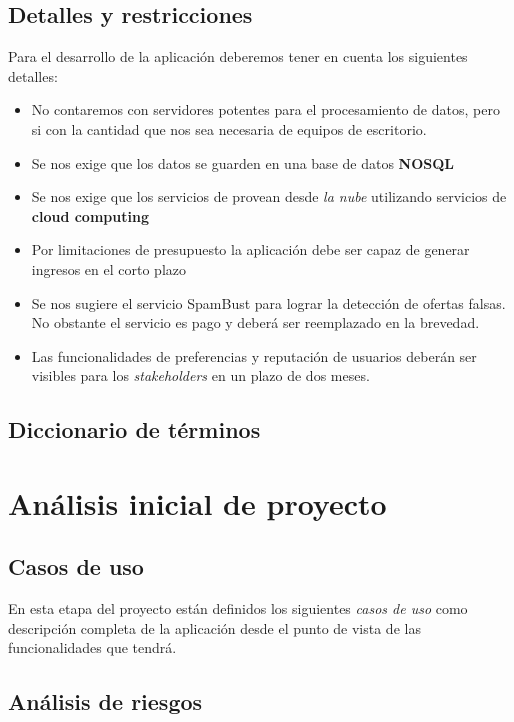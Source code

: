 \documentclass[10pt, a4paper]{article}
\begin{document}
\subsection{Detalles y restricciones}

Para el desarrollo de la aplicación deberemos tener en cuenta los siguientes detalles:

\begin{itemize}
\item No contaremos con servidores potentes para el procesamiento de datos, pero si con la cantidad que nos sea necesaria de equipos de escritorio.
\item Se nos exige que los datos se guarden en una base de datos \textbf{NOSQL}
\item Se nos exige que los servicios de provean desde \emph{la nube} utilizando servicios de \textbf{cloud computing}
\item Por limitaciones de presupuesto la aplicación debe ser capaz de generar ingresos en el corto plazo
\item Se nos sugiere el servicio SpamBust para lograr la detección de ofertas falsas. No obstante el servicio es pago y deberá ser reemplazado en la brevedad.
\item Las funcionalidades de preferencias y reputación de usuarios deberán ser visibles para los \emph{stakeholders} en un plazo de dos meses.
\end{itemize}

\subsection{Diccionario de términos}



\section{Análisis inicial de proyecto}

\subsection{Casos de uso}

En esta etapa del proyecto están definidos los siguientes \emph{casos de uso} como descripción completa de la aplicación desde el punto de vista de las funcionalidades que tendrá.



\subsection{Análisis de riesgos}
\end{document}
